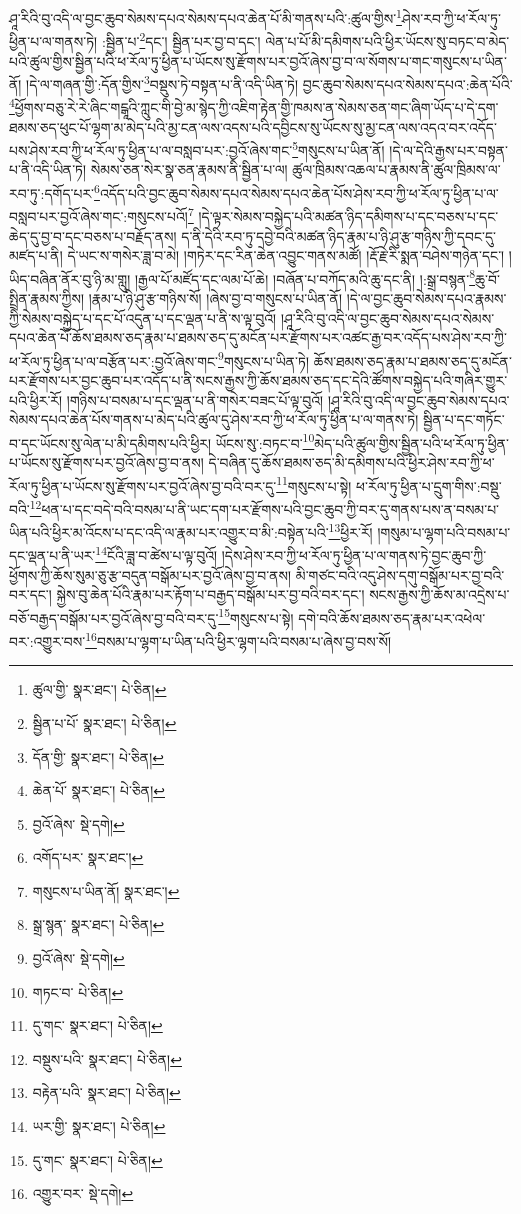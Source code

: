 ཤཱ་རིའི་བུ་འདི་ལ་བྱང་ཆུབ་སེམས་དཔའ་སེམས་དཔའ་ཆེན་པོ་མི་གནས་པའི་:ཚུལ་གྱིས་\footnote{ཚུལ་གྱི་  སྣར་ཐང་།  པེ་ཅིན། }ཤེས་རབ་ཀྱི་ཕ་རོལ་ཏུ་ཕྱིན་པ་ལ་གནས་ཏེ། :སྦྱིན་པ་\footnote{སྦྱིན་པ་པོ་  སྣར་ཐང་།  པེ་ཅིན། }དང་། སྦྱིན་པར་བྱ་བ་དང་། ལེན་པ་པོ་མི་དམིགས་པའི་ཕྱིར་ཡོངས་སུ་བཏང་བ་མེད་པའི་ཚུལ་གྱིས་སྦྱིན་པའི་ཕ་རོལ་ཏུ་ཕྱིན་པ་ཡོངས་སུ་རྫོགས་པར་བྱའོ་ཞེས་བྱ་བ་ལ་སོགས་པ་གང་གསུངས་པ་ཡིན་ནོ། །དེ་ལ་གཞན་གྱི་:དོན་གྱིས་\footnote{དོན་གྱི་  སྣར་ཐང་།  པེ་ཅིན། }བསྡུས་ཏེ་བསྟན་པ་ནི་འདི་ཡིན་ཏེ། བྱང་ཆུབ་སེམས་དཔའ་སེམས་དཔའ་:ཆེན་པོའི་\footnote{ཆེན་པོ་  སྣར་ཐང་།  པེ་ཅིན། }ཕྱོགས་བཅུ་རེ་རེ་ཞིང་གངྒཱའི་ཀླུང་གི་བྱེ་མ་སྙེད་ཀྱི་འཇིག་རྟེན་གྱི་ཁམས་ན་སེམས་ཅན་གང་ཞིག་ཡོད་པ་དེ་དག་ཐམས་ཅད་ཕུང་པོ་ལྷག་མ་མེད་པའི་མྱ་ངན་ལས་འདས་པའི་དབྱིངས་སུ་ཡོངས་སུ་མྱ་ངན་ལས་འདའ་བར་འདོད་པས་ཤེས་རབ་ཀྱི་ཕ་རོལ་ཏུ་ཕྱིན་པ་ལ་བསླབ་པར་:བྱའོ་ཞེས་གང་\footnote{བྱའོ་ཞེས་  སྡེ་དགེ། }གསུངས་པ་ཡིན་ནོ། །དེ་ལ་དེའི་རྒྱས་པར་བསྟན་པ་ནི་འདི་ཡིན་ཏེ། སེམས་ཅན་སེར་སྣ་ཅན་རྣམས་ནི་སྦྱིན་པ་ལ། ཚུལ་ཁྲིམས་འཆལ་པ་རྣམས་ནི་ཚུལ་ཁྲིམས་ལ་རབ་ཏུ་:དགོད་པར་\footnote{འགོད་པར་  སྣར་ཐང་། }འདོད་པའི་བྱང་ཆུབ་སེམས་དཔའ་སེམས་དཔའ་ཆེན་པོས་ཤེས་རབ་ཀྱི་ཕ་རོལ་ཏུ་ཕྱིན་པ་ལ་བསླབ་པར་བྱའོ་ཞེས་གང་:གསུངས་པའོ།\footnote{གསུངས་པ་ཡིན་ནོ།  སྣར་ཐང་། } །དེ་ལྟར་སེམས་བསྐྱེད་པའི་མཚན་ཉིད་དམིགས་པ་དང་བཅས་པ་དང་ཆེད་དུ་བྱ་བ་དང་བཅས་པ་བརྗོད་ནས། ད་ནི་དེའི་རབ་ཏུ་དབྱེ་བའི་མཚན་ཉིད་རྣམ་པ་ཉི་ཤུ་རྩ་གཉིས་ཀྱི་དབང་དུ་མཛད་པ་ནི། དེ་ཡང་ས་གསེར་ཟླ་བ་མེ། །གཏེར་དང་རིན་ཆེན་འབྱུང་གནས་མཚོ། །རྡོ་རྗེ་རི་སྨན་བཤེས་གཉེན་དང་། །ཡིད་བཞིན་ནོར་བུ་ཉི་མ་གླུ། །རྒྱལ་པོ་མཛོད་དང་ལམ་པོ་ཆེ། །བཞོན་པ་བཀོད་མའི་ཆུ་དང་ནི། །:སྒྲ་བསྙན་\footnote{སྒྲ་སྙན་  སྣར་ཐང་།  པེ་ཅིན། }ཆུ་བོ་སྤྲིན་རྣམས་ཀྱིས། །རྣམ་པ་ཉི་ཤུ་རྩ་གཉིས་སོ། །ཞེས་བྱ་བ་གསུངས་པ་ཡིན་ནོ། །དེ་ལ་བྱང་ཆུབ་སེམས་དཔའ་རྣམས་ཀྱི་སེམས་བསྐྱེད་པ་དང་པོ་འདུན་པ་དང་ལྡན་པ་ནི་ས་ལྟ་བུའོ། །ཤཱ་རིའི་བུ་འདི་ལ་བྱང་ཆུབ་སེམས་དཔའ་སེམས་དཔའ་ཆེན་པོ་ཆོས་ཐམས་ཅད་རྣམ་པ་ཐམས་ཅད་དུ་མངོན་པར་རྫོགས་པར་འཚང་རྒྱ་བར་འདོད་པས་ཤེས་རབ་ཀྱི་ཕ་རོལ་ཏུ་ཕྱིན་པ་ལ་བརྩོན་པར་:བྱའོ་ཞེས་གང་\footnote{བྱའོ་ཞེས་  སྡེ་དགེ། }གསུངས་པ་ཡིན་ཏེ། ཆོས་ཐམས་ཅད་རྣམ་པ་ཐམས་ཅད་དུ་མངོན་པར་རྫོགས་པར་བྱང་ཆུབ་པར་འདོད་པ་ནི་སངས་རྒྱས་ཀྱི་ཆོས་ཐམས་ཅད་དང་དེའི་ཚོགས་བསྐྱེད་པའི་གཞིར་གྱུར་པའི་ཕྱིར་རོ། །གཉིས་པ་བསམ་པ་དང་ལྡན་པ་ནི་གསེར་བཟང་པོ་ལྟ་བུའོ། །ཤཱ་རིའི་བུ་འདི་ལ་བྱང་ཆུབ་སེམས་དཔའ་སེམས་དཔའ་ཆེན་པོས་གནས་པ་མེད་པའི་ཚུལ་དུ་ཤེས་རབ་ཀྱི་ཕ་རོལ་ཏུ་ཕྱིན་པ་ལ་གནས་ཏེ། སྦྱིན་པ་དང་གཏོང་བ་དང་ཡོངས་སུ་ལེན་པ་མི་དམིགས་པའི་ཕྱིར། ཡོངས་སུ་:བཏང་བ་\footnote{གཏང་བ་  པེ་ཅིན། }མེད་པའི་ཚུལ་གྱིས་སྦྱིན་པའི་ཕ་རོལ་ཏུ་ཕྱིན་པ་ཡོངས་སུ་རྫོགས་པར་བྱའོ་ཞེས་བྱ་བ་ནས། དེ་བཞིན་དུ་ཆོས་ཐམས་ཅད་མི་དམིགས་པའི་ཕྱིར་ཤེས་རབ་ཀྱི་ཕ་རོལ་ཏུ་ཕྱིན་པ་ཡོངས་སུ་རྫོགས་པར་བྱའོ་ཞེས་བྱ་བའི་བར་དུ་\footnote{དུ་གང་  སྣར་ཐང་།  པེ་ཅིན། }གསུངས་པ་སྟེ། ཕ་རོལ་ཏུ་ཕྱིན་པ་དྲུག་གིས་:བསྡུ་བའི་\footnote{བསྡུས་པའི་  སྣར་ཐང་།  པེ་ཅིན། }ཕན་པ་དང་བདེ་བའི་བསམ་པ་ནི་ཡང་དག་པར་རྫོགས་པའི་བྱང་ཆུབ་ཀྱི་བར་དུ་གནས་པས་ན་བསམ་པ་ཡིན་པའི་ཕྱིར་མ་འོངས་པ་དང་འདི་ལ་རྣམ་པར་འགྱུར་བ་མི་:བསྟེན་པའི་\footnote{བརྟེན་པའི་  སྣར་ཐང་།  པེ་ཅིན། }ཕྱིར་རོ། །གསུམ་པ་ལྷག་པའི་བསམ་པ་དང་ལྡན་པ་ནི་ཡར་\footnote{ཡར་གྱི་  སྣར་ཐང་།  པེ་ཅིན། }ངོའི་ཟླ་བ་ཚེས་པ་ལྟ་བུའོ། །དེས་ཤེས་རབ་ཀྱི་ཕ་རོལ་ཏུ་ཕྱིན་པ་ལ་གནས་ཏེ་བྱང་ཆུབ་ཀྱི་ཕྱོགས་ཀྱི་ཆོས་སུམ་ཅུ་རྩ་བདུན་བསྒོམ་པར་བྱའོ་ཞེས་བྱ་བ་ནས། མི་གཙང་བའི་འདུ་ཤེས་དགུ་བསྒོམ་པར་བྱ་བའི་བར་དང་། སྐྱེས་བུ་ཆེན་པོའི་རྣམ་པར་རྟོག་པ་བརྒྱད་བསྒོམ་པར་བྱ་བའི་བར་དང་། སངས་རྒྱས་ཀྱི་ཆོས་མ་འདྲེས་པ་བཅོ་བརྒྱད་བསྒོམ་པར་བྱའོ་ཞེས་བྱ་བའི་བར་དུ་\footnote{དུ་གང་  སྣར་ཐང་།  པེ་ཅིན། }གསུངས་པ་སྟེ། དགེ་བའི་ཆོས་ཐམས་ཅད་རྣམ་པར་འཕེལ་བར་:འགྱུར་བས་\footnote{འགྱུར་བར་  སྡེ་དགེ། }བསམ་པ་ལྷག་པ་ཡིན་པའི་ཕྱིར་ལྷག་པའི་བསམ་པ་ཞེས་བྱ་བས་སོ། 